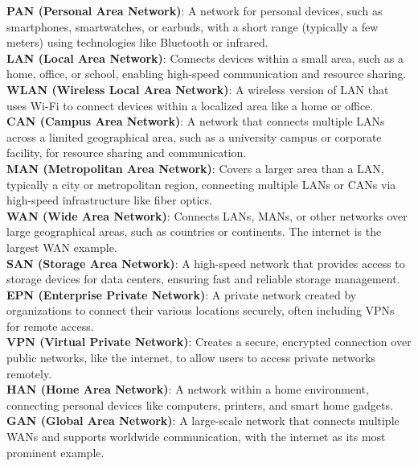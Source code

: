 \begin{Def}

    \textbf{PAN (Personal Area Network)}: A network for personal devices, such as smartphones, smartwatches, or earbuds, with a short range (typically a few meters) using technologies like Bluetooth or infrared.\\

    \noindent
    \textbf{LAN (Local Area Network)}: Connects devices within a small area, such as a home, office, or school, enabling high-speed communication and resource sharing.\\

    \noindent
    \textbf{WLAN (Wireless Local Area Network)}: A wireless version of LAN that uses Wi-Fi to connect devices within a localized area like a home or office.\\

    \noindent
    \textbf{CAN (Campus Area Network)}: A network that connects multiple LANs across a limited geographical area, such as a university campus or corporate facility, for resource sharing and communication.\\

    \noindent
    \textbf{MAN (Metropolitan Area Network)}: Covers a larger area than a LAN, typically a city or metropolitan region, connecting multiple LANs or CANs via high-speed infrastructure like fiber optics.\\

    \noindent
    \textbf{WAN (Wide Area Network)}: Connects LANs, MANs, or other networks over large geographical areas, such as countries or continents. The internet is the largest WAN example.\\

    \noindent
    \textbf{SAN (Storage Area Network)}: A high-speed network that provides access to storage devices for data centers, ensuring fast and reliable storage management.\\

    \noindent
    \textbf{EPN (Enterprise Private Network)}: A private network created by organizations to connect their various locations securely, often including VPNs for remote access.\\

    \noindent
    \textbf{VPN (Virtual Private Network)}: Creates a secure, encrypted connection over public networks, like the internet, to allow users to access private networks remotely.\\

    \noindent
    \textbf{HAN (Home Area Network)}: A network within a home environment, connecting personal devices like computers, printers, and smart home gadgets.\\

    \noindent
    \textbf{GAN (Global Area Network)}: A large-scale network that connects multiple WANs and supports worldwide communication, with the internet as its most prominent example.

    \hfill \cite{petryschuk_types_of_networks}
\end{Def}

